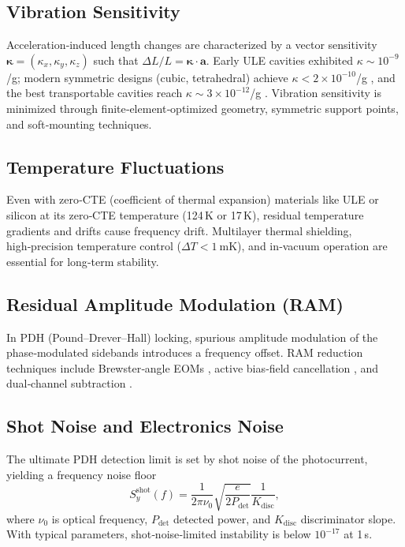 \documentclass[12pt,a4paper]{article}
\begin{document}
\subsection{Vibration Sensitivity}
Acceleration‑induced length changes are characterized by a vector sensitivity $\boldsymbol{\kappa} = (\kappa_x,\kappa_y,\kappa_z)$ such that $\Delta L/L = \boldsymbol{\kappa} \cdot \mathbf{a}$. Early ULE cavities exhibited $\kappa \sim 10^{-9}$/g; modern symmetric designs (cubic, tetrahedral) achieve $\kappa < 2\times10^{-10}$/g \cite{hafner2015}, and the best transportable cavities reach $\kappa \sim 3\times10^{-12}$/g \cite{herbers2022}. Vibration sensitivity is minimized through finite‑element‑optimized geometry, symmetric support points, and soft‑mounting techniques.

\subsection{Temperature Fluctuations}
Even with zero‑CTE (coefficient of thermal expansion) materials like ULE or silicon at its zero‑CTE temperature (124 K or 17 K), residual temperature gradients and drifts cause frequency drift. Multilayer thermal shielding, high‑precision temperature control ($\Delta T < \SI{1}{\milli\kelvin}$), and in‑vacuum operation are essential for long‑term stability.

\subsection{Residual Amplitude Modulation (RAM)}
In PDH (Pound–Drever–Hall) locking, spurious amplitude modulation of the phase‑modulated sidebands introduces a frequency offset. RAM reduction techniques include Brewster‑angle EOMs \cite{tai2016}, active bias‑field cancellation \cite{parke2025}, and dual‑channel subtraction \cite{zhang2014_ram}.

\subsection{Shot Noise and Electronics Noise}
The ultimate PDH detection limit is set by shot noise of the photocurrent, yielding a frequency noise floor
\begin{equation}
S_y^{\mathrm{shot}}(f) = \frac{1}{2\pi \nu_0} \sqrt{\frac{e}{2 P_{\mathrm{det}}}} \frac{1}{K_{\mathrm{disc}}},
\end{equation}
where $\nu_0$ is optical frequency, $P_{\mathrm{det}}$ detected power, and $K_{\mathrm{disc}}$ discriminator slope. With typical parameters, shot‑noise‑limited instability is below $10^{-17}$ at 1 s.
\end{document}
